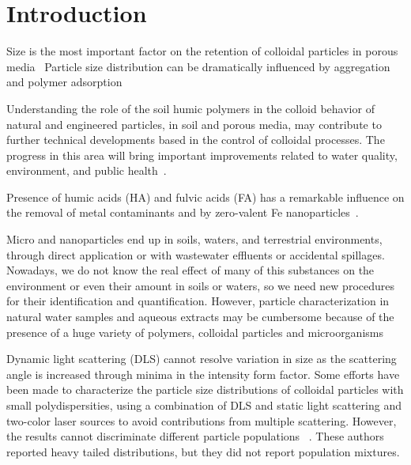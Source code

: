 \documentclass[journal=langd5,manuscript=article]{achemso}
\begin{document}
\section{Introduction}







Size is the most important factor on the retention of colloidal particles in porous media~\cite{Sirivithayapakorn2003,Sen2006}
Particle size distribution can be dramatically influenced by aggregation and polymer adsorption~\cite{Fang2009}


Understanding  the role of the soil humic polymers in the colloid behavior of natural and engineered particles, in soil and porous media, may contribute to further technical developments based in the control of colloidal processes. The progress in this area will bring important improvements related to water quality, environment, and public health~\cite{Ngo2008}\cite{Farre2011}.

Presence of humic acids (HA) and fulvic acids (FA) has a remarkable influence on the removal of metal contaminants 
  and   by zero-valent Fe nanoparticles~\cite{Mak2011234}.

Micro and nanoparticles end up in soils, waters, and  terrestrial environments, through direct application or with wastewater effluents or accidental spillages. Nowadays, we do not know the real effect of many of this substances on the environment or even their amount in soils or waters, so we need new procedures for their identification and quantification. However, particle characterization in natural water samples and aqueous extracts may be cumbersome because of the presence of a huge variety of polymers, colloidal particles and microorganisms~\cite{Ngo2008}


Dynamic light scattering (DLS)  cannot resolve variation in size as the scattering angle is increased through minima in the intensity form factor. Some efforts have been made to characterize the particle size distributions of colloidal particles with small polydispersities, using a combination of DLS and static light scattering and two-color laser sources to avoid contributions from multiple scattering. However, the results cannot discriminate different particle populations~\cite{Bryant2003AccurateSuspensions} . These authors reported heavy tailed distributions, but they did not report population mixtures.
\end{document}
